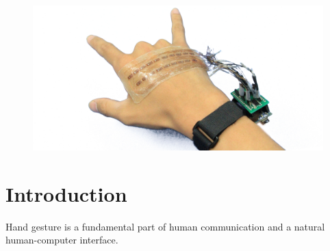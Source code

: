 \documentclass{sigchi}
\begin{document}
\begin{abstract}
We conducted a user study with 10 participants to better understand gesture recognition accuracy and the effects of sensing locations. Results showed that sensor reading patterns differ significantly across users, but are consistent for the same user. The leave-one-user-out accuracy is low at an average of 27.4\%, but reaches 95.8\% average accuracy for 16 popular hand gestures when personalized for each participant. The optimal sensing location spans the 1/8\texttildelow{}1/4 area between the metacarpophalangeal joints (MCP, the knuckles between the hand and fingers) and the head of ulna (tip of the wrist).


\end{abstract}




\begin{figure}
  \begin{center}
  \includegraphics[width=1\columnwidth]{figures/BackHand.jpg}
  \caption{}
  \label{fig:FIGURE1}
  \end{center}
\end{figure}


\section{Introduction}
Hand gesture is a fundamental part of human communication and a natural human-computer interface.
\end{document}

